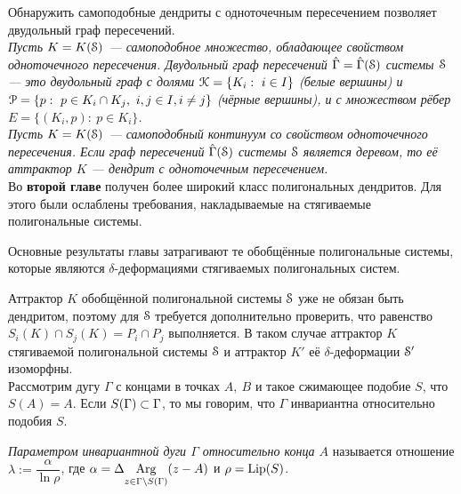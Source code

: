 

Обнаружить самоподобные дендриты с одноточечным пересечением позволяет двудольный граф пересечений.\\

{\em  Пусть $K=K({\EuScript S})$ --- самоподобное множество, обладающее свойством одноточечного пересечения.
{\em Двудольный граф пересечений} $\hat\Gamma=\hat\Gamma({\EuScript S})$ системы ${\EuScript S}$ --- это двудольный граф с долями ${\EuScript K}=\{K_i:\ i\in I\}$ (белые вершины) и ${\EuScript P}=\{p:\ p\in K_i\cap K_j,\ i,j\in I, i\neq j\}$ (чёрные вершины), и с множеством рёбер $E=\{(K_i,p):\ p\in K_i\}$.}\\

{\em Пусть $K=K({\EuScript S})$ --- самоподобный континуум со свойством одноточечного пересечения.
Если граф пересечений $\hat\Gamma({\EuScript S})$ системы ${\EuScript S}$ является деревом, то её аттрактор $K$ --- дендрит с одноточечным пересечением.}\\



Во \textbf{второй главе} получен более широкий класс полигональных дендритов. 
Для этого были ослаблены требования, накладываемые на стягиваемые полигональные системы.


Основные результаты главы затрагивают те обобщённые полигональные системы, которые являются $\delta$-деформациями стягиваемых полигональных систем.


Аттрактор $K$ обобщённой полигональной системы ${\EuScript S}$ уже не обязан быть дендритом, поэтому  для ${\EuScript S}$ требуется дополнительно проверить, что равенство $S_i(K)\cap S_j(K)=P_i\cap P_j$ выполняется.
В таком случае аттрактор $K$ стягиваемой полигональной системы ${\EuScript S}$ и аттрактор $K'$ её $\delta$-деформации ${\EuScript S}'$ изоморфны.\\

Рассмотрим дугу  $\Gamma$ с концами в точках $A,\ B$ и такое сжимающее подобие $S$, что $S(A)=A$.
Если $S(\Gamma)\subset\Gamma$, то мы говорим, что $\Gamma$ инвариантна относительно подобия $S$.

{\em Параметром инвариантной дуги $\Gamma$ относительно конца $A$} называется отношение $\lambda:=\dfrac{\alpha}{\ln\rho}$, где $\alpha=\Delta\underset{{z\in\Gamma\setminus S(\Gamma)}}{\mathrm {Arg}}(z-A)$ и $\rho=\mathop{\rm Lip} \nolimits(S)$.\\

